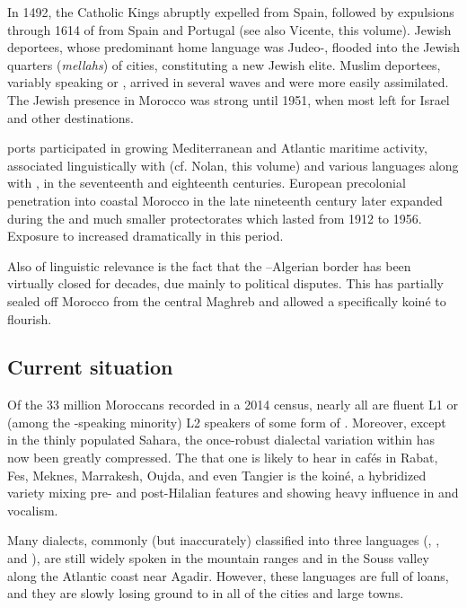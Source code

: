 \documentclass[output=paper]{langsci/langscibook}
\begin{document}
In 1492, the Catholic Kings abruptly expelled   from Spain, followed by expulsions through 1614 of  from Spain and Portugal (see also Vicente, this volume). Jewish deportees, whose predominant home language was Judeo-, flooded into the Jewish quarters (\textit{mellahs}) of  cities, constituting a new Jewish elite. Muslim deportees, variably speaking  or , arrived in several waves and were more easily assimilated. The Jewish presence in Morocco was strong until 1951, when most  left for Israel and other destinations.

 ports participated in growing Mediterranean and Atlantic maritime activity, associated linguistically with  (cf. Nolan, this volume) and various  languages along with , in the seventeenth and eighteenth centuries. European precolonial penetration into coastal Morocco in the late nineteenth century later expanded during the  and much smaller  protectorates which lasted from 1912 to 1956. Exposure to  increased dramatically in this period. 

Also of linguistic relevance is the fact that the –Algerian border has been virtually closed for decades, due mainly to political disputes. This has partially sealed off Morocco from the central Maghreb and allowed a specifically  koiné to flourish.

\subsection{Current situation}

Of the 33 million Moroccans recorded in a 2014 census, nearly all are fluent L1 or (among the -speaking minority) L2 speakers of some form of . Moreover, except in the thinly populated  Sahara, the once-robust dialectal variation within  has now been greatly compressed. The  that one is likely to hear in cafés in Rabat, Fes, Meknes, Marrakesh, Oujda, and even Tangier is the  koiné, a hybridized variety mixing pre- and post-Hilalian features and showing heavy  influence in  and vocalism.

Many  dialects, commonly (but inaccurately) classified into three languages (, , and ), are still widely spoken in the mountain ranges and in the Souss valley along the Atlantic coast near Agadir. However, these  languages are full of  loans, and they are slowly losing ground to  in all of the cities and large towns.
\end{document}
